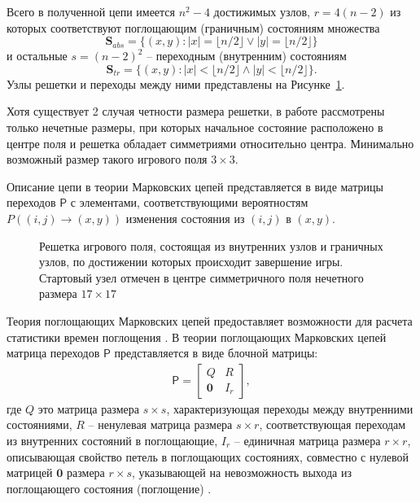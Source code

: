 Всего в полученной цепи имеется $n^2-4$ достижимых узлов, $r=4(n-2)$ из которых соответствуют поглощающим (граничным) состояниям множества 
\begin{equation}
    \textbf{S}_{abs} = \{(x,y) : |x|=\lfloor n/2 \rfloor \lor |y|=\lfloor n/2 \rfloor\}
    \label{eq:border-states}
\end{equation}
и остальные $s=(n-2)^2$ -- переходным (внутренним) состояниям 
\begin{equation}
    \textbf{S}_{tr} = \{(x,y): |x|<\lfloor n/2 \rfloor \land |y|<\lfloor n/2 \rfloor\}.
    \label{eq:inner-states}
\end{equation}
Узлы решетки и переходы между ними представлены на Рисунке~\cref{fig:game_field}. 

Хотя существует 2 случая четности размера решетки, в работе рассмотрены только нечетные размеры, при которых начальное состояние расположено в центре поля и решетка обладает симметриями относительно центра. Минимально возможный размер такого игрового поля $3 \times 3$. 

Описание цепи в теории Марковских цепей представляется в виде матрицы переходов \cite{kemeny_finite_1976} $\mathsf{P}$ с элементами, соответствующими вероятностям \\ $P\left ((i, j) \rightarrow (x, y)\right )$ изменения состояния из $(i, j)$ в $(x, y)$.

\begin{figure}[ht]
    \caption{
        Решетка игрового поля, состоящая из внутренних узлов и граничных узлов, по достижении которых происходит завершение игры. Стартовый узел отмечен в центре симметричного поля нечетного размера $17 \times 17$
    }\label{fig:game_field}
\end{figure}

Теория поглощающих Марковских цепей предоставляет возможности для расчета статистики времен поглощения \cite{kemeny_finite_1976}. В теории поглощающих Марковских цепей матрица переходов $\mathsf{P}$ представляется в виде блочной матрицы:
\begin{equation}
    \begin{aligned}
    \mathsf{P}=
      \begin{bmatrix}
        Q & R \\
        \textbf{0} & I_r
      \end{bmatrix},
    \label{eq:P}
    \end{aligned}
\end{equation}
где $Q$ это матрица размера $s \times s$, характеризующая переходы между внутренними состояниями, 
$R$ -- ненулевая матрица размера $s \times r$, соответствующая переходам из внутренних состояний в поглощающие, $I_r$ -- единичная матрица размера $r \times r$, описывающая свойство петель в поглощающих состояниях, совместно с нулевой матрицей $\textbf{0}$ размера $r \times s$, указывающей на невозможность выхода из поглощающего состояния (поглощение) \cite{kemeny_finite_1976}.

